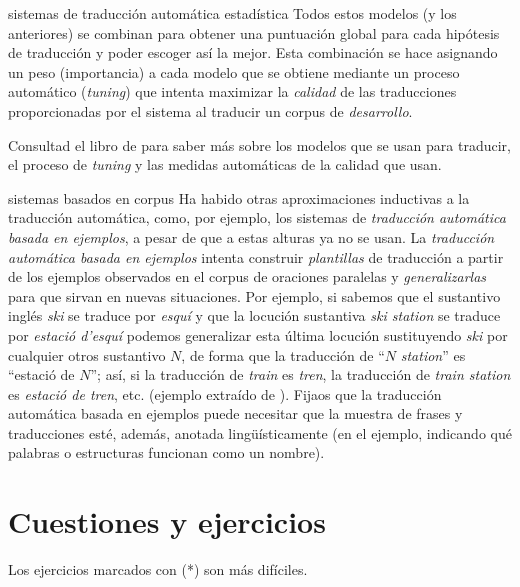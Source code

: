 \begin{persabermes}{sistemas de traducción automática estadística}
Todos estos modelos (y los anteriores) se combinan para obtener una puntuación global para cada hipótesis de traducción y poder escoger así la mejor. Esta combinación se hace asignando un peso (importancia) a cada modelo que se obtiene mediante un proceso automático (\emph{tuning}) que intenta maximizar la \emph{calidad} de las traducciones proporcionadas por el sistema al traducir un corpus de \emph{desarrollo}. 

Consultad el libro de \citet{koehnbook} para saber más sobre los modelos que se usan para traducir, el proceso de \emph{tuning} y las medidas automáticas de la calidad que usan. \end{persabermes} 

\begin{persabermes}{sistemas basados en corpus} Ha habido otras aproximaciones inductivas a la traducción automática, como, por ejemplo, los sistemas de \emph{traducción automática basada en ejemplos}, a pesar de que a estas alturas ya no se usan. La \emph{traducción automática basada en ejemplos} intenta construir \emph{plantillas} de traducción a partir de los ejemplos observados en el corpus de oraciones paralelas y \emph{generalizarlas} para que sirvan en nuevas situaciones. Por ejemplo, si sabemos que el sustantivo inglés \emph{ski} se traduce por \emph{esquí} y que la locución sustantiva \emph{ski station} se traduce por \emph{estació d'esquí} podemos generalizar esta última locución sustituyendo \emph{ski} por cualquier otros sustantivo $N$, de forma que la traducción de ``$N$ \emph{station}'' es ``estació de $N$''; así, si la traducción de \emph{train} es \emph{tren}, la traducción de \emph{train station} es \emph{estació de tren}, etc. (ejemplo extraído de \citealt{carl01j}). Fijaos que la traducción automática basada en ejemplos puede necesitar que la muestra de frases y traducciones esté, además, anotada lingüísticamente (en el ejemplo, indicando qué palabras o estructuras funcionan como un nombre). \end{persabermes} 

\section{Cuestiones y ejercicios} Los ejercicios marcados con (*) son más difíciles. 

